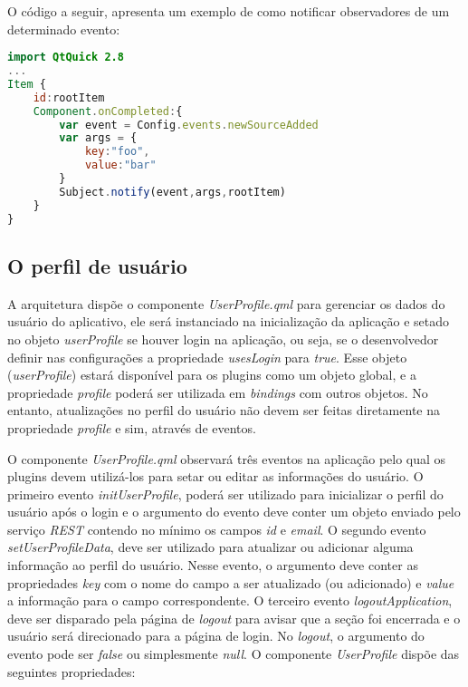 O código a seguir, apresenta um exemplo de como notificar observadores de um determinado evento:

\begin{center}
\begin{lstlisting}[language=qml]
import QtQuick 2.8
...
Item {
	id:rootItem
	Component.onCompleted:{
		var event = Config.events.newSourceAdded
		var args = {
			key:"foo",
			value:"bar"
		}
		Subject.notify(event,args,rootItem)
	}
}
\end{lstlisting}
\end{center}


\subsection{O perfil de usuário}\label{sec:solucao-desenvolvida}
A arquitetura dispõe o componente \textit{UserProfile.qml} para gerenciar os dados do usuário do aplicativo, ele será instanciado na inicialização da aplicação e setado no objeto \textit{userProfile} se houver login na aplicação, ou seja, se o desenvolvedor definir nas configurações a propriedade \textit{usesLogin} para \textit{true}. Esse objeto (\textit{userProfile}) estará disponível para os plugins como um objeto global, e a propriedade \textit{profile} poderá ser utilizada em \textit{bindings} com outros objetos. No entanto, atualizações no perfil do usuário não devem ser feitas diretamente na propriedade \textit{profile} e sim, através de eventos.\par

O componente \textit{UserProfile.qml} observará três eventos na aplicação pelo qual os plugins devem utilizá-los para setar ou editar as informações do usuário. O primeiro evento \textit{initUserProfile}, poderá ser utilizado para inicializar o perfil do usuário após o login e o argumento do evento deve conter um objeto enviado pelo serviço \textit{REST} contendo no mínimo os campos \textit{id} e \textit{email}. O segundo evento \textit{setUserProfileData}, deve ser utilizado para atualizar ou adicionar alguma informação ao perfil do usuário. Nesse evento, o argumento deve conter as propriedades \textit{key} com o nome do campo a ser atualizado (ou adicionado) e \textit{value} a informação para o campo correspondente. O terceiro evento \textit{logoutApplication}, deve ser disparado pela página de \textit{logout} para avisar que a seção foi encerrada e o usuário será direcionado para a página de login. No \textit{logout}, o argumento do evento pode ser \textit{false} ou simplesmente \textit{null}. O componente \textit{UserProfile} dispõe das seguintes propriedades:

